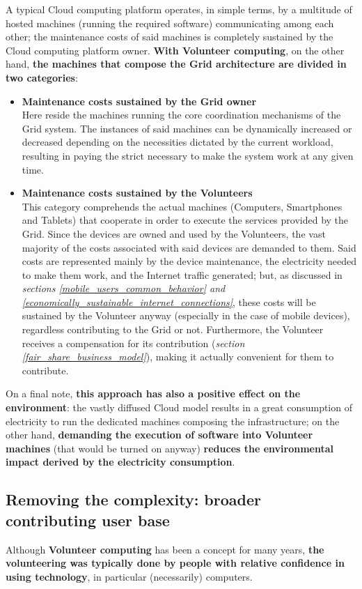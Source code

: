 A typical Cloud computing platform operates, in simple terms, by a multitude of hosted machines (running the required software) communicating among each other; the maintenance costs of said machines is completely sustained by the Cloud computing platform owner. \textbf{With Volunteer computing}, on the other hand, \textbf{the machines that compose the Grid architecture are divided in two categories}:
\begin{itemize}
    \item \textbf{Maintenance costs sustained by the Grid owner}\\
    Here reside the machines running the core coordination mechanisms of the Grid system. The instances of said machines can be dynamically increased or decreased depending on the necessities dictated by the current workload, resulting in paying the strict necessary to make the system work at any given time.
    \item \textbf{Maintenance costs sustained by the Volunteers}\\
    This category comprehends the actual machines (Computers, Smartphones and Tablets) that cooperate in order to execute the services provided by the Grid. Since the devices are owned and used by the Volunteers, the vast majority of the costs associated with said devices are demanded to them. Said costs are represented mainly by the device maintenance, the electricity needed to make them work, and the Internet traffic generated; but, as discussed in \textit{sections \ref{mobile_users_common_behavior} and \ref{economically_sustainable_internet_connections}}, these costs will be sustained by the Volunteer anyway (especially in the case of mobile devices), regardless contributing to the Grid or not. Furthermore, the Volunteer receives a compensation for its contribution (\textit{section \ref{fair_share_business_model}}), making it actually convenient for them to contribute.
\end{itemize}

On a final note, \textbf{this approach has also a positive effect on the environment}: the vastly diffused Cloud model results in a great consumption of electricity to run the dedicated machines composing the infrastructure; on the other hand, \textbf{demanding the execution of software into Volunteer machines} (that would be turned on anyway) \textbf{reduces the environmental impact derived by the electricity consumption}.

\subsection{Removing the complexity: broader contributing user base}
Although \textbf{Volunteer computing} has been a concept for many years, \textbf{the volunteering was typically done by people with relative confidence in using technology}, in particular (necessarily) computers.

